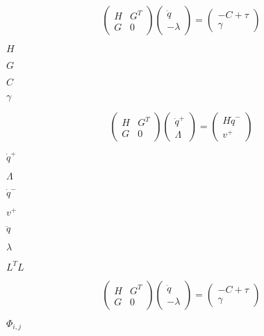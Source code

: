 \documentclass{article}
\begin{document}
\[ \left( \begin{array}{cc} H & G^T \\ G & 0 \end{array} \right) \left( \begin{array}{c} \ddot{q} \\ - \lambda \end{array} \right) = \left( \begin{array}{c} -C + \tau \\ \gamma \end{array} \right) \]
\pagebreak

$H$
\pagebreak

$G$
\pagebreak

$C$
\pagebreak

$\gamma$
\pagebreak

\[ \left( \begin{array}{cc} H & G^T \\ G & 0 \end{array} \right) \left( \begin{array}{c} \dot{q}^{+} \\ \Lambda \end{array} \right) = \left( \begin{array}{c} H \dot{q}^{-} \\ v^{+} \end{array} \right) \]
\pagebreak

$\dot{q}^{+}$
\pagebreak

$\Lambda$
\pagebreak

$\dot{q}^{-}$
\pagebreak

$v^{+}$
\pagebreak

$\ddot{q}$
\pagebreak

$\lambda$
\pagebreak

$L^TL$
\pagebreak

\[ \left( \begin{array}{cc} H & G^T \\ G & 0 \end{array} \right) \left( \begin{array}{c} \ddot{q} \\ -\lambda \end{array} \right) = \left( \begin{array}{c} -C + \tau \\ \gamma \end{array} \right) \]
\pagebreak

$\Phi_{i,j}$
\pagebreak
\end{document}
